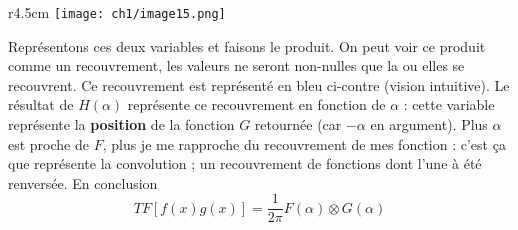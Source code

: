\begin{wrapfigure}[8]{r}{4.5cm}
\vspace{-6mm}
\texttt{[image: ch1/image15.png]}
\end{wrapfigure}
Représentons ces deux variables et faisons le produit. On peut voir ce produit comme un 
recouvrement, les valeurs ne seront non-nulles que la ou elles se recouvrent. Ce recouvrement 
est représenté en bleu ci-contre (vision intuitive). Le résultat de $H(\alpha)$ représente 
ce recouvrement en fonction de $\alpha$ : cette variable représente la \textbf{position} de la
fonction $G$ retournée (car $-\alpha$ en argument). Plus $\alpha$ est proche de $F$, plus 
je me rapproche du recouvrement de mes fonction : c'est ça que représente la convolution ; un 
recouvrement de fonctions dont l'une à été renversée. En conclusion
\begin{equation}
TF[f(x)g(x)] = \frac{1}{2\pi}F(\alpha)\otimes G(\alpha)
\end{equation}







































